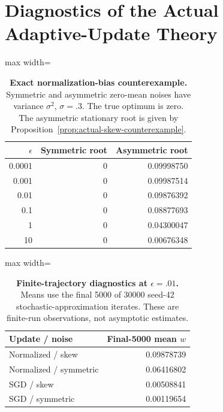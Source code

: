 \section{Diagnostics of the Actual Adaptive-Update Theory}
\label{app:actual-theory-diagnostics}
\begin{table}[htbp]
\centering
\caption{\textbf{Exact normalization-bias counterexample.} Symmetric and asymmetric zero-mean noises have variance $\sigma^2$, $\sigma=.3$. The true optimum is zero. The asymmetric stationary root is given by Proposition~\ref{prop:actual-skew-counterexample}.}
\label{tab:actual-normalization}
\begin{adjustbox}{max width=\linewidth}
\begin{tabular}{rrr}
\toprule
$\epsilon$ & Symmetric root & Asymmetric root \\
\midrule
0.0001 & 0 & 0.09998750 \\
0.001 & 0 & 0.09987514 \\
0.01 & 0 & 0.09876392 \\
0.1 & 0 & 0.08877693 \\
1 & 0 & 0.04300047 \\
10 & 0 & 0.00676348 \\
\bottomrule
\end{tabular}
\end{adjustbox}
\end{table}
\begin{table}[htbp]
\centering
\caption{\textbf{Finite-trajectory diagnostics at $\epsilon=.01$.} Means use the final 5000 of 30000 seed-42 stochastic-approximation iterates. These are finite-run observations, not asymptotic estimates.}
\label{tab:normalization-tail}
\begin{adjustbox}{max width=\linewidth}
\begin{tabular}{lr}
\toprule
Update / noise & Final-5000 mean $w$ \\
\midrule
Normalized / skew & 0.09878739 \\
Normalized / symmetric & 0.06416802 \\
SGD / skew & 0.00508841 \\
SGD / symmetric & 0.00119654 \\
\bottomrule
\end{tabular}
\end{adjustbox}
\end{table}

